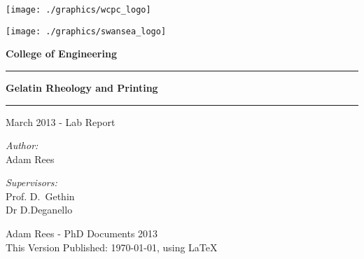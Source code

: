 \begin{titlepage}
\begin{center}
\thispagestyle{plain}
\vspace*{1.0cm}
\texttt{[image: ./graphics/wcpc\_logo]}

\texttt{[image: ./graphics/swansea\_logo]}

\textbf{\LARGE{College of Engineering}}
\vspace{2cm}
\hrule
\vspace{0.5cm}
{\Huge \textbf{Gelatin Rheology and Printing}} \\[0.5cm]
\hrule
\vspace{0.5cm}
\LARGE{March 2013 - Lab Report}
\vspace{2.5cm}

\begin{minipage}{0.4\textwidth}
\begin{flushleft} 
\LARGE \emph{Author:}\\ Adam Rees
\end{flushleft}
\end{minipage}
\begin{minipage}{0.4\textwidth}
\begin{flushright}
\LARGE \emph{Supervisors:} \\ Prof. D.~Gethin \\ Dr D.Deganello
\end{flushright}
\end{minipage}

\vfill

\large {Adam Rees - PhD Documents 2013}\\
This Version Published: \today, using \LaTeX


\end{center}
\end{titlepage}
